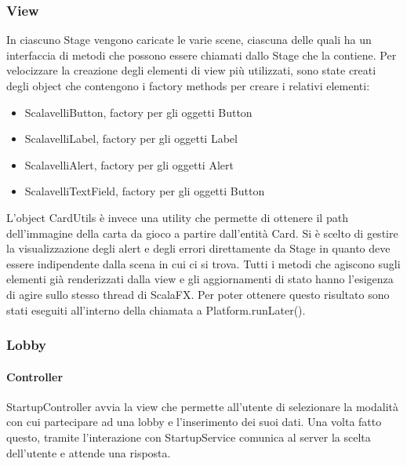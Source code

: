 \subsubsection{View}
In ciascuno Stage vengono caricate le varie scene, ciascuna delle quali ha un interfaccia di metodi che possono essere chiamati dallo Stage che la contiene.
\newline
Per velocizzare la creazione degli elementi di view più utilizzati, sono state creati degli object che contengono i factory methods per creare i relativi elementi:
\begin{itemize}
    \item ScalavelliButton, factory per gli oggetti Button
    \item ScalavelliLabel, factory per gli oggetti Label
    \item ScalavelliAlert, factory per gli oggetti Alert
    \item ScalavelliTextField, factory per gli oggetti Button
\end{itemize}
L’object CardUtils è invece una utility che permette di ottenere il path dell’immagine della carta da gioco a partire dall’entità Card.
Si è scelto di gestire la visualizzazione degli alert e degli errori direttamente da Stage in quanto deve essere indipendente dalla scena in cui ci si trova.
Tutti i metodi che agiscono sugli elementi già renderizzati dalla view e gli aggiornamenti di stato hanno l’esigenza di agire sullo stesso thread di ScalaFX. Per poter ottenere questo risultato sono stati eseguiti all’interno della chiamata a Platform.runLater().

\subsubsection{Lobby}

\paragraph{Controller}
StartupController avvia la view che permette all’utente di selezionare la modalità con cui partecipare ad una lobby e l’inserimento dei suoi dati.
Una volta fatto questo, tramite l’interazione con StartupService comunica al server la scelta dell’utente e attende una risposta.

